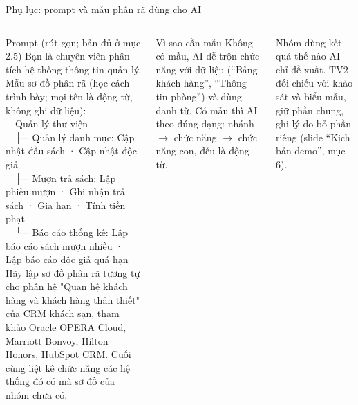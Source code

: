 \begin{frame}{Phụ lục: prompt và mẫu phân rã dùng cho AI \TB}
\begin{columns}[T]
\begin{block}{Prompt (rút gọn; bản đủ ở  mục 2.5)}
\tiny\ttfamily
Bạn là chuyên viên phân tích hệ thống thông tin quản lý.\\
Mẫu sơ đồ phân rã (học cách trình bày; mọi tên là động từ, không ghi dữ liệu):\\
\ \ Quản lý thư viện\\
\ \ ├─ Quản lý danh mục: Cập nhật đầu sách · Cập nhật độc giả\\
\ \ ├─ Mượn trả sách: Lập phiếu mượn · Ghi nhận trả sách · Gia hạn · Tính tiền phạt\\
\ \ └─ Báo cáo thống kê: Lập báo cáo sách mượn nhiều · Lập báo cáo độc giả quá hạn\\
Hãy lập sơ đồ phân rã tương tự cho phân hệ "Quan hệ khách hàng và khách hàng thân thiết" của CRM khách sạn, tham khảo Oracle OPERA Cloud, Marriott Bonvoy, Hilton Honors, HubSpot CRM. Cuối cùng liệt kê chức năng các hệ thống đó có mà sơ đồ của nhóm chưa có.
\end{block}
\begin{block}{Vì sao cần mẫu}
\scriptsize Không có mẫu, AI dễ trộn chức năng với dữ liệu (``Bảng khách hàng'', ``Thông tin phòng'') và dùng danh từ. Có mẫu thì AI theo đúng dạng: nhánh $\to$ chức năng $\to$ chức năng con, đều là động từ.
\end{block}
\begin{block}{Nhóm dùng kết quả thế nào}
\scriptsize AI chỉ đề xuất. TV2 đối chiếu với khảo sát và biểu mẫu, giữ phần chung, ghi lý do bỏ phần riêng (slide ``Kịch bản demo'',  mục 6).
\end{block}
\end{columns}
\end{frame}

